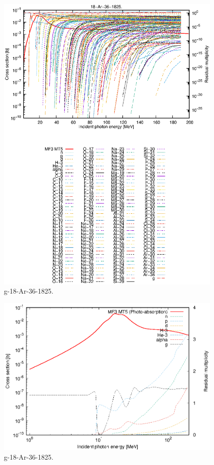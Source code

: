 \begin{figure}
 \includegraphics[width=\linewidth]{eps/g_18-Ar-36_1825.eps}
  \caption{g-18-Ar-36-1825.}
\end{figure}
\newpage \clearpage

\begin{figure}
 \includegraphics[width=\linewidth]{eps-log/g_18-Ar-36_1825.eps}
 \caption{g-18-Ar-36-1825.}
\end{figure}
\newpage \clearpage

